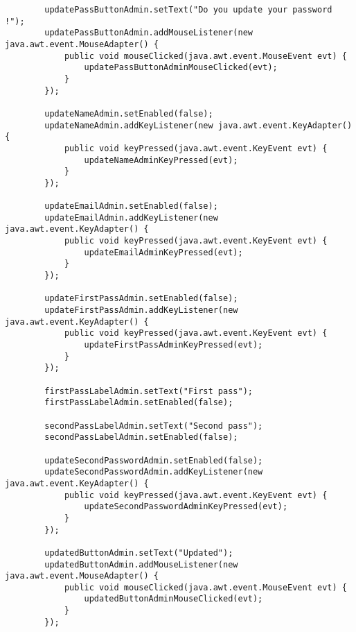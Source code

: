 \documentclass[12pt,a4paper]{article}
\begin{document}
\begin{lstlisting}
        updatePassButtonAdmin.setText("Do you update your password !");
        updatePassButtonAdmin.addMouseListener(new java.awt.event.MouseAdapter() {
            public void mouseClicked(java.awt.event.MouseEvent evt) {
                updatePassButtonAdminMouseClicked(evt);
            }
        });

        updateNameAdmin.setEnabled(false);
        updateNameAdmin.addKeyListener(new java.awt.event.KeyAdapter() {
            public void keyPressed(java.awt.event.KeyEvent evt) {
                updateNameAdminKeyPressed(evt);
            }
        });

        updateEmailAdmin.setEnabled(false);
        updateEmailAdmin.addKeyListener(new java.awt.event.KeyAdapter() {
            public void keyPressed(java.awt.event.KeyEvent evt) {
                updateEmailAdminKeyPressed(evt);
            }
        });

        updateFirstPassAdmin.setEnabled(false);
        updateFirstPassAdmin.addKeyListener(new java.awt.event.KeyAdapter() {
            public void keyPressed(java.awt.event.KeyEvent evt) {
                updateFirstPassAdminKeyPressed(evt);
            }
        });

        firstPassLabelAdmin.setText("First pass");
        firstPassLabelAdmin.setEnabled(false);

        secondPassLabelAdmin.setText("Second pass");
        secondPassLabelAdmin.setEnabled(false);

        updateSecondPasswordAdmin.setEnabled(false);
        updateSecondPasswordAdmin.addKeyListener(new java.awt.event.KeyAdapter() {
            public void keyPressed(java.awt.event.KeyEvent evt) {
                updateSecondPasswordAdminKeyPressed(evt);
            }
        });

        updatedButtonAdmin.setText("Updated");
        updatedButtonAdmin.addMouseListener(new java.awt.event.MouseAdapter() {
            public void mouseClicked(java.awt.event.MouseEvent evt) {
                updatedButtonAdminMouseClicked(evt);
            }
        });


\end{lstlisting}
\end{document}

